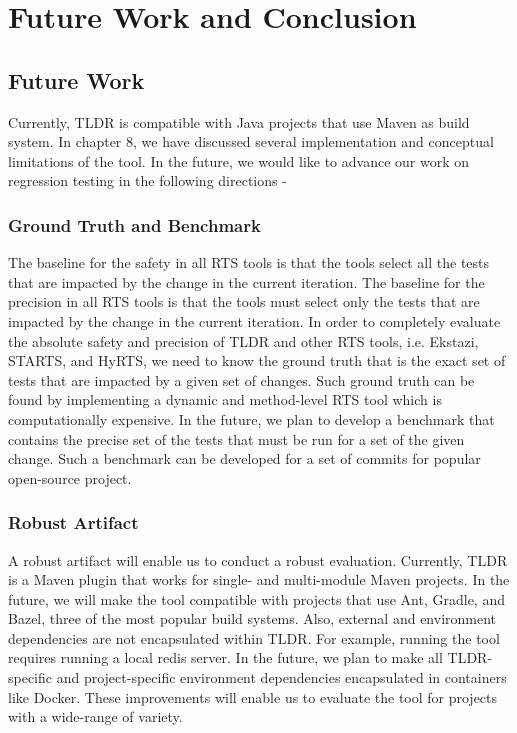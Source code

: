 \chapter{Future Work and Conclusion}
\section{Future Work}
Currently, TLDR is compatible with Java projects that use Maven as build system. In chapter 8, we have discussed several implementation and conceptual limitations of the tool. In  the future, we would like to advance our work on regression testing in the following directions - 

\subsection{Ground Truth and Benchmark}
The baseline for the safety in all RTS tools is that the tools select all the tests that are impacted by the change in the current iteration. The baseline for the precision in all RTS tools is that the tools must select only the tests that are impacted by the change in the current iteration. In order to completely evaluate the absolute safety and precision of TLDR and other RTS tools, i.e. Ekstazi, STARTS, and HyRTS, we need to know the ground truth that is the exact set of tests that are impacted by a given set of changes. Such ground truth can be found by implementing a dynamic and method-level RTS tool which is computationally expensive. In the future, we plan to develop a benchmark that contains the precise set of the tests that must be run for a set of the given change. Such a benchmark can be developed for a set of commits for popular open-source project. 

\subsection{Robust Artifact}
A robust artifact will enable us to conduct a robust evaluation. Currently, TLDR is a Maven plugin that works for single- and multi-module Maven projects. In the future, we will make the tool compatible with projects that use Ant, Gradle, and Bazel, three of the most popular build systems. Also, external and environment dependencies are not encapsulated within TLDR. For example, running the tool requires running a local redis server. In the future, we plan to make all TLDR-specific and project-specific environment dependencies encapsulated in containers like Docker. These improvements will enable us to evaluate the tool for projects with a wide-range of variety. 

